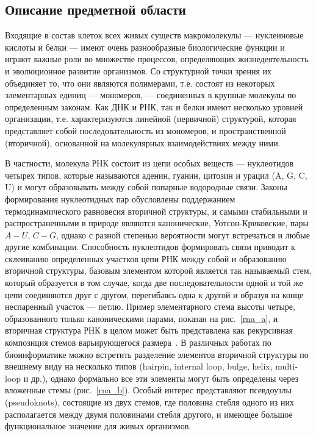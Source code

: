 \label{sec:relatedworks}
\subsection{Описание предметной области}
Входящие в состав клеток всех живых существ макромолекулы --- нуклеиновые кислоты и белки --- имеют очень разнообразные биологические функции и играют важные роли во множестве процессов, определяющих жизнедеятельность и эволюционное развитие организмов. Со структурной точки зрения их объединяет то, что они являются полимерами, т.е. состоят из некоторых элементарных единиц --- мономеров, --- соединенных в крупные молекулы по определенным законам.  Как ДНК и РНК, так и белки имеют несколько уровней организации, т.е. характеризуются линейной (первичной) структурой, которая представляет собой последовательность из мономеров, и пространственной (вторичной), основанной на молекулярных взаимодействиях между ними. 

В частности, молекула РНК состоит из цепи особых веществ --- нуклеотидов четырех типов, которые называются аденин, гуанин, цитозин и урацил (A, G, C, U) и могут образовывать между собой попарные водородные связи. Законы формирования нуклеотидных пар обусловлены поддержанием термодинамического равновесия вторичной структуры, и самыми стабильными и распространенными в природе являются канонические, Уотсон-Криковские, пары $A-U$, $C-G$, однако с разной степенью вероятности могут встречаться и любые другие комбинации. Способность нуклеотидов формировать связи приводит к склеиванию определенных участков цепи РНК между собой и образованию вторичной структуры, базовым элементом которой является так называемый стем, который образуется в том случае, когда две последовательности одной и той же цепи соединяются друг с другом, перегибаясь одна к другой и образуя на конце неспаренный участок --- петлю. Пример элементарного стема высоты четыре, образованного только каноническими парами, показан на рис.~\ref{rna_a}, и вторичная структура РНК в целом может быть представлена как рекурсивная композиция стемов варьирующегося размера~\cite{quadrini2019loop}. В различных работах по биоинформатике можно встретить разделение элементов вторичной структуры по внешнему виду на несколько типов (hairpin, internal loop, bulge, helix, multi-loop и др.), однако формально все эти элементы могут быть определены через вложенные стемы (рис.~\ref{rna_b}). Особый интерес представляют псевдоузлы (pseudoknots), состоящие из двух стемов, где половина стебля одного из них располагается между двумя половинами стебля другого, и имеющее большое функциональное значение для живых организмов. 

